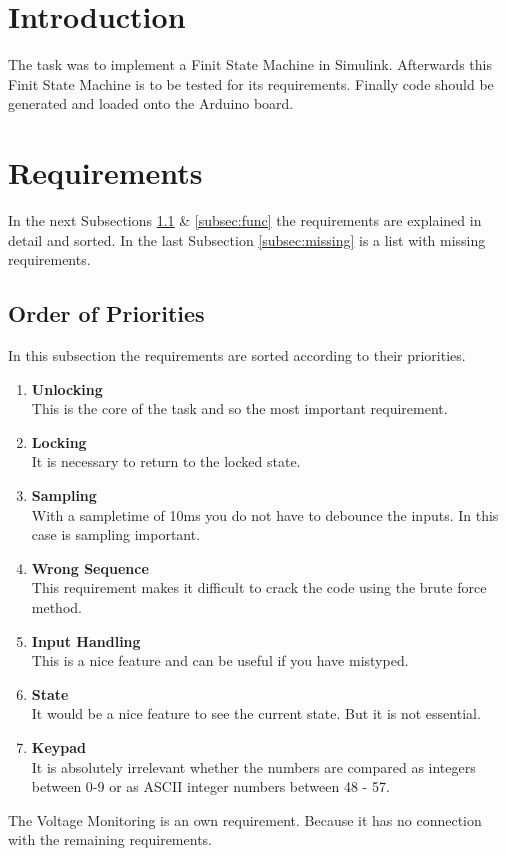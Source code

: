 \section*{Introduction}
The task was to implement a Finit State Machine in Simulink.
Afterwards this Finit State Machine is to be tested for its requirements.
Finally code should be generated and loaded onto the Arduino board. 

\section{Requirements}
In the next Subsections \ref{subsec:prio} \& \ref{subsec:func} the requirements are explained in detail and sorted. In the last Subsection \ref{subsec:missing} is a list with missing requirements.


	\subsection{Order of Priorities} \label{subsec:prio}
	In this subsection the requirements are sorted according to their priorities.
		\begin{enumerate}
			\item \textbf{Unlocking}\\
				This is the core of the task and so the most important requirement.
			\item \textbf{Locking}\\
				It is necessary to return to the locked state.
			\item \textbf{Sampling}\\
				With a sampletime of 10ms you do not have to debounce the inputs. In this case is sampling important.							
			\item \textbf{Wrong Sequence}\\
				This requirement makes it difficult to crack the code using the brute force method.
			\item \textbf{Input Handling}\\
				This is a nice feature and can be useful if you have mistyped.
			\item \textbf{State}\\
				It would be a nice feature to see the current state. But it is not essential.		
			\item \textbf{Keypad}\\
				It is absolutely irrelevant whether the numbers are compared as integers between 0-9 or as ASCII integer numbers between 48 - 57.
		\end{enumerate}	
The Voltage Monitoring is an own requirement. Because it has no connection with the remaining requirements.
	
